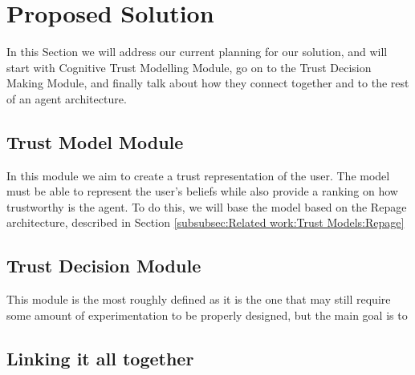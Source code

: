 \section{Proposed Solution}
\label{sec:Solution}
In this Section we will address our current planning for our solution, and will start with Cognitive Trust Modelling Module, go on to the Trust Decision Making Module, and finally talk about how they connect together and to the rest of an agent architecture.


\subsection{Trust Model Module}
\label{subsec:Solution:Trust Assessment Module}
In this module we aim to create a trust representation of the user. The model must be able to represent the user's beliefs while also provide a ranking on how trustworthy is the agent. To do this, we will base the model based on the Repage architecture, described in Section \ref{subsubsec:Related work:Trust Models:Repage}



\subsection{Trust Decision Module}
\label{subsec:Solution:Trust Decision Making Module}
This module is the most roughly defined as it is the one that may still require some amount of experimentation to be properly designed, but the main goal is to 


\subsection{Linking it all together}
\label{subsec:Solution:Linking all together}